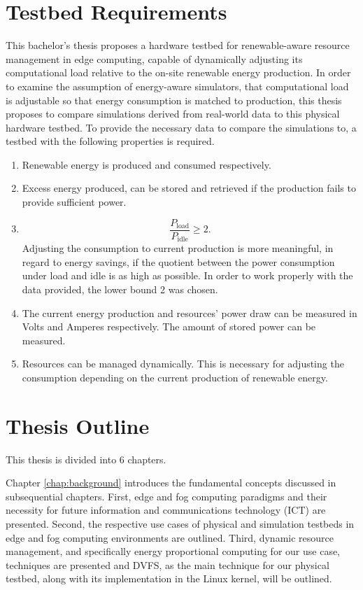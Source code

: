 \section{Testbed Requirements}
\label{sec:testbed_requirements}

This bachelor's thesis proposes a hardware testbed for renewable-aware resource
management in edge computing, capable of dynamically adjusting its computational
load relative to the on-site renewable energy production. In order to examine
the assumption of energy-aware simulators, that computational load is adjustable
so that energy consumption is matched to production, this thesis proposes to
compare simulations derived from real-world data to this physical hardware
testbed. To provide the necessary data to compare the simulations to, a testbed
with the following properties is required.

\begin{enumerate}
    \item Renewable energy is produced and consumed respectively.
    \item Excess energy produced, can be stored and retrieved if the production
        fails to provide sufficient power.
    \item \[ \frac{P_{\text{load}}}{P_{\text{idle}}} \geq 2 .\]
        Adjusting the consumption to current production is more meaningful, in
        regard to energy savings, if the quotient between the power consumption
        under load and idle is as high as possible. In order to work properly
        with the data provided, the lower bound 2 was chosen.
    \item The current energy production and resources' power draw can be
        measured in Volts and Amperes respectively. The amount of stored power
        can be measured.
    \item Resources can be managed dynamically. This is necessary for adjusting
        the consumption depending on the current production of renewable energy.
\end{enumerate}

\section{Thesis Outline}

This thesis is divided into 6 chapters.

Chapter \ref{chap:background} introduces the fundamental concepts discussed in
subsequential chapters. First, edge and fog computing paradigms and their
necessity for future information and communications technology (ICT) are
presented. Second, the respective use cases of physical and simulation testbeds
in edge and fog computing environments are outlined. Third, dynamic resource
management, and specifically energy proportional computing for our use case,
techniques are presented and DVFS, as the main technique for our physical
testbed, along with its implementation in the Linux kernel, will be outlined.

